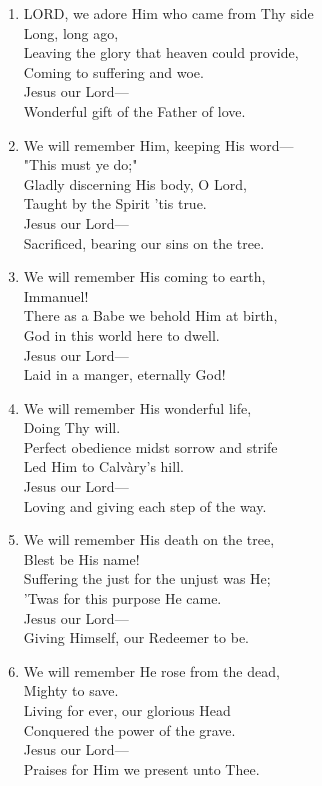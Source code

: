\begin{enumerate}
    \item LORD, we adore Him who came from Thy side \\
        Long, long ago, \\
        Leaving the glory that heaven could provide, \\
        Coming to suffering and woe. \\
        Jesus our Lord--- \\
        Wonderful gift of the Father of love.

    \item We will remember Him, keeping His word--- \\
        "This must ye do;" \\
        Gladly discerning His body, O Lord, \\
        Taught by the Spirit 'tis true. \\
        Jesus our Lord--- \\
        Sacrificed, bearing our sins on the tree.

    \item We will remember His coming to earth, \\
        Immanuel! \\
        There as a Babe we behold Him at birth, \\
        God in this world here to dwell. \\
        Jesus our Lord--- \\
        Laid in a manger, eternally God!

    \item We will remember His wonderful life, \\
        Doing Thy will. \\
        Perfect obedience midst sorrow and strife \\
        Led Him to Calv\`ary's hill. \\
        Jesus our Lord--- \\
        Loving and giving each step of the way.

    \item We will remember His death on the tree, \\
        Blest be His name! \\
        Suffering the just for the unjust was He; \\
        'Twas for this purpose He came. \\
        Jesus our Lord--- \\
        Giving Himself, our Redeemer to be.

    \item We will remember He rose from the dead, \\
        Mighty to save. \\
        Living for ever, our glorious Head \\
        Conquered the power of the grave. \\
        Jesus our Lord--- \\
        Praises for Him we present unto Thee.

\end{enumerate}

